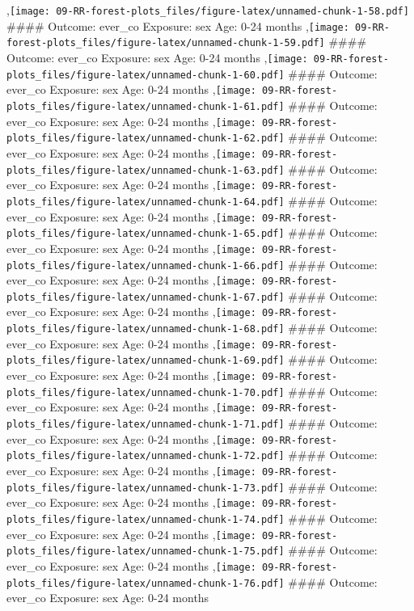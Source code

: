 \documentclass[
  9pt,
]{book}
\begin{document}
,\texttt{[image: 09-RR-forest-plots\_files/figure-latex/unnamed-chunk-1-58.pdf]}
\#\#\#\# Outcome: ever\_co Exposure: sex Age: 0-24 months
,\texttt{[image: 09-RR-forest-plots\_files/figure-latex/unnamed-chunk-1-59.pdf]}
\#\#\#\# Outcome: ever\_co Exposure: sex Age: 0-24 months
,\texttt{[image: 09-RR-forest-plots\_files/figure-latex/unnamed-chunk-1-60.pdf]}
\#\#\#\# Outcome: ever\_co Exposure: sex Age: 0-24 months
,\texttt{[image: 09-RR-forest-plots\_files/figure-latex/unnamed-chunk-1-61.pdf]}
\#\#\#\# Outcome: ever\_co Exposure: sex Age: 0-24 months
,\texttt{[image: 09-RR-forest-plots\_files/figure-latex/unnamed-chunk-1-62.pdf]}
\#\#\#\# Outcome: ever\_co Exposure: sex Age: 0-24 months
,\texttt{[image: 09-RR-forest-plots\_files/figure-latex/unnamed-chunk-1-63.pdf]}
\#\#\#\# Outcome: ever\_co Exposure: sex Age: 0-24 months
,\texttt{[image: 09-RR-forest-plots\_files/figure-latex/unnamed-chunk-1-64.pdf]}
\#\#\#\# Outcome: ever\_co Exposure: sex Age: 0-24 months
,\texttt{[image: 09-RR-forest-plots\_files/figure-latex/unnamed-chunk-1-65.pdf]}
\#\#\#\# Outcome: ever\_co Exposure: sex Age: 0-24 months
,\texttt{[image: 09-RR-forest-plots\_files/figure-latex/unnamed-chunk-1-66.pdf]}
\#\#\#\# Outcome: ever\_co Exposure: sex Age: 0-24 months
,\texttt{[image: 09-RR-forest-plots\_files/figure-latex/unnamed-chunk-1-67.pdf]}
\#\#\#\# Outcome: ever\_co Exposure: sex Age: 0-24 months
,\texttt{[image: 09-RR-forest-plots\_files/figure-latex/unnamed-chunk-1-68.pdf]}
\#\#\#\# Outcome: ever\_co Exposure: sex Age: 0-24 months
,\texttt{[image: 09-RR-forest-plots\_files/figure-latex/unnamed-chunk-1-69.pdf]}
\#\#\#\# Outcome: ever\_co Exposure: sex Age: 0-24 months
,\texttt{[image: 09-RR-forest-plots\_files/figure-latex/unnamed-chunk-1-70.pdf]}
\#\#\#\# Outcome: ever\_co Exposure: sex Age: 0-24 months
,\texttt{[image: 09-RR-forest-plots\_files/figure-latex/unnamed-chunk-1-71.pdf]}
\#\#\#\# Outcome: ever\_co Exposure: sex Age: 0-24 months
,\texttt{[image: 09-RR-forest-plots\_files/figure-latex/unnamed-chunk-1-72.pdf]}
\#\#\#\# Outcome: ever\_co Exposure: sex Age: 0-24 months
,\texttt{[image: 09-RR-forest-plots\_files/figure-latex/unnamed-chunk-1-73.pdf]}
\#\#\#\# Outcome: ever\_co Exposure: sex Age: 0-24 months
,\texttt{[image: 09-RR-forest-plots\_files/figure-latex/unnamed-chunk-1-74.pdf]}
\#\#\#\# Outcome: ever\_co Exposure: sex Age: 0-24 months
,\texttt{[image: 09-RR-forest-plots\_files/figure-latex/unnamed-chunk-1-75.pdf]}
\#\#\#\# Outcome: ever\_co Exposure: sex Age: 0-24 months
,\texttt{[image: 09-RR-forest-plots\_files/figure-latex/unnamed-chunk-1-76.pdf]}
\#\#\#\# Outcome: ever\_co Exposure: sex Age: 0-24 months
\end{document}
